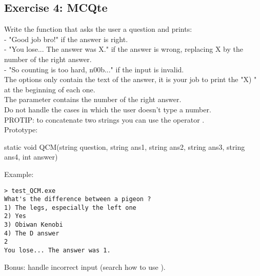 \subsection{Exercise 4: MCQte}

Write the  function that asks the user a question and prints:\\
- "Good job bro!" if the answer is right.\\
- "You lose... The answer was X." if the answer is wrong, replacing X by
the number of the right answer.\\
- "So counting is too hard, n00b..." if the input is invalid.\\
The  options only contain the text of the answer, it is your job to
print the "X) " at the beginning of each one.\\
The  parameter contains the number of the right answer.\\
Do not handle the cases in which the user doesn't type a number.\\
PROTIP: to concatenate two strings you can use the operator \codeil{+}.\\

Prototype:
\begin{code}
static void QCM(string question,
                string ans1,
                string ans2,
                string ans3,
                string ans4,
                int answer)
\end{code}

Example:
\begin{verbatim}
> test_QCM.exe
What's the difference between a pigeon ?
1) The legs, especially the left one
2) Yes
3) Obiwan Kenobi
4) The D answer
2
You lose... The answer was 1.
\end{verbatim}

Bonus: handle incorrect input (search how to use ).
